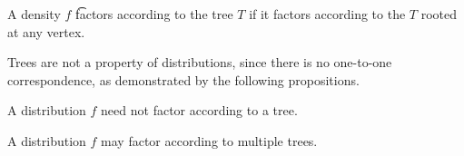 
A density $f$
\t{factors according to the tree} $T$
if it factors according to the
$T$ rooted at any vertex.


Trees are not a property of distributions,
since there is no one-to-one correspondence,
as demonstrated by the following propositions.


A distribution $f$ need not factor according to a tree.

A distribution
$f$ may factor according to multiple trees.
\strats
